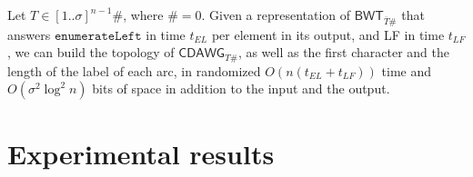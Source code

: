 \documentclass[a4paper,UKenglish]{lipics-v2016}
\newcommand{\REV}[1]{\ensuremath{\overline{#1}}}
\newcommand{\BWT}{\ensuremath{\mathsf{BWT}}}
\newcommand{\CDAWG}{\ensuremath{\mathsf{CDAWG}}}
\begin{document}
\begin{lemma} \label{lemma:cdawg2}
Let $T \in [1..\sigma]^{n-1}\#$, where $\#=0$. Given a representation of $\BWT_{\REV{T}\#}$ that answers $\mathtt{enumerateLeft}$ in time $t_{EL}$ per element in its output, and LF in time $t_{LF}$, we can build the topology of $\CDAWG_{T\#}$, as well as the first character and the length of the label of each arc, in randomized $O(n(t_{EL}+t_{LF}))$ time and $O(\sigma^{2}\log^{2}{n})$ bits of space in addition to the input and the output.
\end{lemma}












































\section{Experimental results} \label{sec:experiments}
\end{document}
